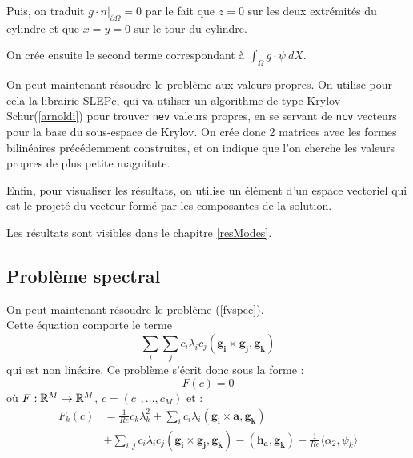 

Puis, on traduit $g\cdot n\big\rvert_{\partial\Omega}=0$ par le fait que $z=0$ sur les deux extrémités du cylindre et que $x=y=0$ sur le tour du cylindre.



On crée ensuite le second terme correspondant à $\int_\Omega g\cdot\psi\ dX$.



On peut maintenant résoudre le problème aux valeurs propres. On utilise pour cela la librairie \href{http://www.grycap.upv.es/slepc/}{SLEPc}, qui va utiliser un algorithme de type Krylov-Schur(\ref{arnoldi}) pour trouver \texttt{nev} valeurs propres, en se servant de \texttt{ncv} vecteurs pour la base du sous-espace de Krylov. On crée donc 2 matrices avec les formes bilinéaires précédemment construites, et on indique que l'on cherche les valeurs propres de plus petite magnitute.



Enfin, pour visualiser les résultats, on utilise un élément d'un espace vectoriel qui est le projeté du vecteur formé par les composantes de la solution.



Les résultats sont visibles dans le chapitre \ref{resModes}.

\fi

\subsection{Problème spectral}

On peut maintenant résoudre le problème (\ref{fvspec}).\\
Cette équation comporte le terme
\[
\sum_i\sum_j c_i\lambda_i c_j(\mathbf{g_i}\times \mathbf{g_j}, \mathbf{g_k})
\]
qui est non linéaire. Ce problème s'écrit donc sous la forme :
\[
F(c) = 0
\]
où $F:{\mathbb{R}}^M\rightarrow{\mathbb{R}}^M$, $c=(c_1,\ldots, c_M)$ et :
\begin{align*}
F_k(c) &= \frac{1}{Re} c_k\lambda_k^2 + \sum_i c_i\lambda_i(\mathbf{g_i}\times \mathbf{a}, \mathbf{g_k})\\
&+ \sum_{i,j} c_i\lambda_i c_j (\mathbf{g_i}\times \mathbf{g_j}, \mathbf{g_k}) - (\mathbf{h_a},\mathbf{g_k}) - \frac{1}{Re}\langle \alpha_2, \psi_k \rangle
\end{align*}

